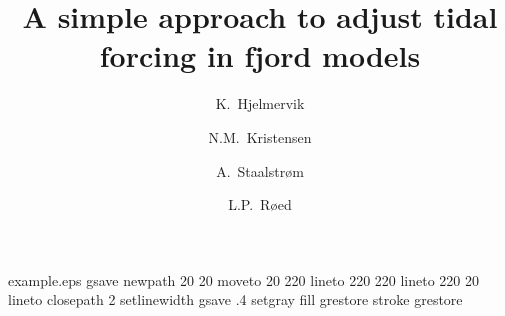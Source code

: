 \begin{filecontents*}{example.eps}
gsave
newpath
  20 20 moveto
  20 220 lineto
  220 220 lineto
  220 20 lineto
closepath
2 setlinewidth
gsave
  .4 setgray fill
grestore
stroke
grestore
\end{filecontents*}


\RequirePackage{fix-cm}
%
\documentclass[smallcondensed]{svjour3}     %
%
\smartqed  %
%
\usepackage{graphicx}
%
%
%
%
\usepackage{hhline}
\usepackage{natbib}
\usepackage{subfigure}
\usepackage{amssymb}
\usepackage[latin1]{inputenc}
\usepackage[usenames]{color}

%


\title{A simple approach to adjust tidal forcing in fjord models
}


\author{K.~Hjelmervik \and N.M.~Kristensen \and A.~Staalstr{\o}m \and L.P.~R{\o}ed
}



